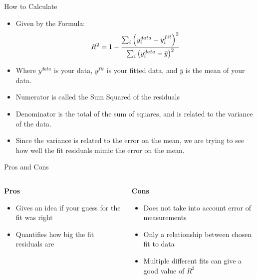 \documentclass{beamer}
\begin{document}
\begin{frame}{How to Calculate}
  \begin{itemize}
  \item Given by the Formula:
    \begin{align*}
      R^2=1-\frac{\sum_i\qty(y^{data}_i-y^{fit}_i)^2}
      {\sum_i\qty(y^{data}_i-\bar{y})^2}
    \end{align*}
  \item Where $y^{data}$ is your data, $y^{fit}$ is your fitted data, and $\bar{y}$ is the mean of your data.
  \item Numerator is called the Sum Squared of the residuals
  \item Denominator is the total of the sum of squares, and is related to the variance of the data.
  \item Since the variance is related to the error on the mean, we are trying to see how well the fit residuals mimic the error on the mean.
  \end{itemize}
\end{frame}

\begin{frame}{Pros and Cons}
  \begin{columns}
    \begin{column}{0.5\textwidth}
      \textbf{Pros}
      \begin{itemize}
      \item Gives an idea if your guess for the fit was right
      \item Quantifies how big the fit residuals are
      \end{itemize}
    \end{column}
    \begin{column}{0.5\textwidth}
      \textbf{Cons}
      \begin{itemize}
      \item Does not take into account error of measurements
      \item Only a relationship between chosen fit to data
      \item Multiple different fits can give a good value of $R^2$
      \end{itemize}
    \end{column}
  \end{columns}
\end{frame}
\end{document}
